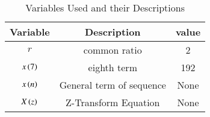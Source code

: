 \documentclass[journal,12pt,twocolumn]{IEEEtran}
\theoremstyle{remark}
\begin{document}
\begin{table}[ht]
\renewcommand\thetable{1}
    \centering
    \begin{tabular}{|c|c|c|}
    \hline
        Variable&             Description&value\\\hline
             $r$&            common ratio&2    \\\hline
     $x\left(7\right)$&              eighth term&192  \\\hline
     $x\left(n\right)$&General term of sequence&None \\\hline
     $X\left(z\right)$&    Z-Transform Equation&None \\\hline
    \end{tabular}
    \vspace{0.3cm}
    \caption{Variables Used and their Descriptions}
    \label{table 11.9.3.2.1}
\end{table}
\end{document}
